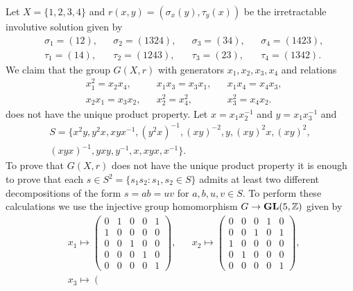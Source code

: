 \begin{example}
    \label{pro:4-19}
	Let $X=\{1,2,3,4\}$ and $r(x,y)=(\sigma_x(y),\tau_y(x))$ be the irretractable involutive solution given by 
	\begin{align*}
		&\sigma_1=(12), && \sigma_2=(1324), && \sigma_3=(34), && \sigma_4=(1423),\\
		&\tau_1=(14), &&\tau_2=(1243), && \tau_3=(23), && \tau_4=(1342).
	\end{align*}
	We claim that the group $G(X,r)$ with 
	generators
	$x_1,x_2,x_3,x_4$ and relations
	\begin{align*}
		& x_1^2=x_2x_4,
		&& x_1x_3=x_3x_1,
		&& x_1x_4=x_4x_3,\\
		& x_2x_1=x_3x_2,
		&& x_2^2=x_4^2,
		&& x_3^2=x_4x_2.
	\end{align*}
	does not have the unique product property. Let $x=x_1x_2^{-1}$ and $y=x_1x_3^{-1}$ and 
    \begin{multline}
    \label{eq:Promislow}
    S=\{ x^2y,
    y^2x,
    xyx^{-1},
    (y^2x)^{-1},
    (xy)^{-2},
    y,
    (xy)^2x,
    (xy)^2,\\
    (xyx)^{-1},
    yxy,
    y^{-1},
    x,
    xyx, 
    x^{-1}
	\}.
    \end{multline}
    To prove that $G(X,r)$ does not have
    the unique product property it is enough to prove that 
    each $s\in S^2=\{s_1s_2:s_1,s_2\in S\}$ admits at least two different decompositions 
    of the form $s=ab=uv$ for $a,b,u,v\in S$. To perform these calculations we 
    use the injective group homomorphism $G\to\mathbf{GL}(5,\mathbb{Z})$ given by  
	\begin{align*}
	&x_1\mapsto\left(\begin{smallmatrix}
	0 & 1 & 0 & 0 & 1\\
	1 & 0 & 0 & 0 & 0\\
	0 & 0 & 1 & 0 & 0\\
	0 & 0 & 0 & 1 & 0\\
	0 & 0 & 0 & 0 & 1
  	\end{smallmatrix}\right),
  	&&
	x_2\mapsto\left(\begin{smallmatrix}
	0 & 0 & 0 & 1 & 0\\
	0 & 0 & 1 & 0 & 1\\
	1 & 0 & 0 & 0 & 0\\
	0 & 1 & 0 & 0 & 0\\
	0 & 0 & 0 & 0 & 1
  	\end{smallmatrix}\right),
  	\\
  	&x_3\mapsto\left(\begin{smallmatrix}

\end{smallmatrix}
\end{align*}
\end{example}

